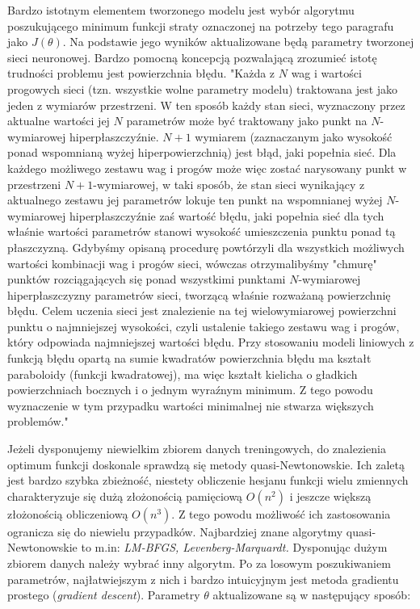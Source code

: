 \documentclass[11pt]{book}
\theoremstyle{definition}
\begin{document}
Bardzo istotnym elementem tworzonego modelu jest wybór algorytmu poszukującego minimum funkcji straty oznaczonej na potrzeby tego paragrafu jako $J(\theta)$. Na podstawie jego wyników aktualizowane będą parametry tworzonej sieci neuronowej. Bardzo pomocną koncepcją pozwalającą zrozumieć istotę trudności problemu jest powierzchnia błędu. "Każda z $N$ wag i wartości progowych sieci (tzn. wszystkie wolne parametry modelu) traktowana jest jako jeden z wymiarów przestrzeni. W ten sposób każdy stan sieci, wyznaczony przez aktualne wartości jej $N$ parametrów może być traktowany jako punkt na $N$-wymiarowej hiperpłaszczyźnie. $N+1$ wymiarem (zaznaczanym jako wysokość ponad wspomnianą wyżej hiperpowierzchnią) jest błąd, jaki popełnia sieć. Dla każdego możliwego zestawu wag i progów może więc zostać narysowany punkt w przestrzeni $N+1$-wymiarowej, w taki sposób, że stan sieci wynikający z aktualnego zestawu jej parametrów lokuje ten punkt na wspomnianej wyżej $N$-wymiarowej hiperpłaszczyźnie zaś wartość błędu, jaki popełnia sieć dla tych właśnie wartości parametrów stanowi wysokość umieszczenia punktu ponad tą płaszczyzną. Gdybyśmy opisaną procedurę powtórzyli dla wszystkich możliwych wartości kombinacji wag i progów sieci, wówczas otrzymalibyśmy "chmurę" punktów rozciągających się ponad wszystkimi punktami $N$-wymiarowej hiperpłaszczyzny parametrów sieci, tworzącą właśnie rozważaną powierzchnię błędu. Celem uczenia sieci jest znalezienie na tej wielowymiarowej powierzchni punktu o najmniejszej wysokości, czyli ustalenie takiego zestawu wag i progów, który odpowiada najmniejszej wartości błędu. Przy stosowaniu modeli liniowych z funkcją błędu opartą na sumie kwadratów powierzchnia błędu ma kształt paraboloidy (funkcji kwadratowej), ma więc kształt kielicha o gładkich powierzchniach bocznych i o jednym wyraźnym minimum. Z tego powodu wyznaczenie w tym przypadku wartości minimalnej nie stwarza większych problemów."\cite{Statsoft}

Jeżeli dysponujemy niewielkim zbiorem danych treningowych, do znalezienia optimum funkcji doskonale sprawdzą się metody quasi-Newtonowskie. Ich zaletą jest bardzo szybka zbieżność, niestety obliczenie hesjanu funkcji wielu zmiennych charakteryzuje się dużą złożonością pamięciową $O(n^2)$ i jeszcze większą złożonością obliczeniową $O(n^3)$. Z tego powodu możliwość ich zastosowania ogranicza się do niewielu przypadków. Najbardziej znane algorytmy quasi-Newtonowskie to m.in: \textit{LM-BFGS, Levenberg-Marquardt.} Dysponując dużym zbiorem danych należy wybrać inny algorytm. Po za losowym poszukiwaniem parametrów, najłatwiejszym z nich i bardzo intuicyjnym jest metoda gradientu prostego (\textit{gradient descent}). Parametry $\theta$ aktualizowane są w następujący sposób:
\end{document}
